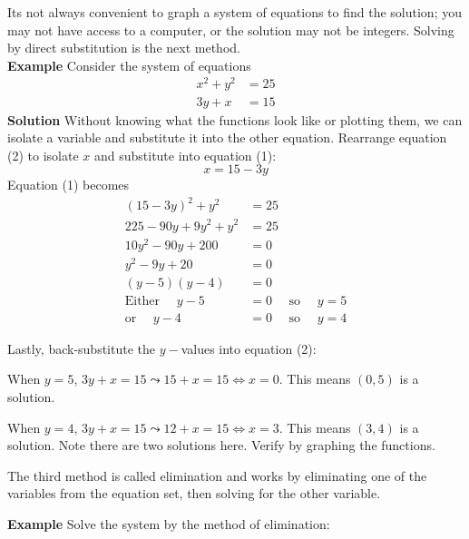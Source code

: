  Its not always convenient to graph a system of equations to find the solution; you may not have access to a computer, or the solution may not be integers. Solving by direct substitution is the next method.\\
 
 \textbf{Example} Consider the system of equations
 \begin{align}x^{2} +y^{2} &  = 25 \tag{1} \\
 3 y +x &  = 15 \tag{2}\end{align}
 \textbf{Solution} Without knowing what the functions look like or plotting them, we can isolate a variable and substitute it into the other equation. Rearrange equation (2) to isolate $x$ and substitute into equation (1):
$$x =  15 -3 y $$
 Equation (1) becomes
 \begin{align*}(15-3y)^2+y^2 &  =  25 \tag{expand and simplify}\\
 225-90y+9y^2+y^2&=25\\
 10 y^{2} -90 y +200 &  =  0 \tag{divide by 10}\\
 y^{2} -9 y +20 &  = 0 \tag{factor the quadratic}\\
 \left (y -5\right ) \left (y -4\right ) &  =  0 \\
 \text{Either }\quad y -5 &  =  0\quad\text{ so }\quad y =5 \\
 \text{or }\quad y -4 &  =  0\quad\text{ so }\quad y =4\end{align*}
 
Lastly, back-substitute the $y-$values into equation (2): 
 
 When $y =5$, $3 y +x =15 \leadsto 15 +x =15 \Longleftrightarrow x =0$. This means $\left (0 ,5\right )$ is a solution. 
 
 When $y =4$, $3 y +x =15 \leadsto 12 +x =15 \Longleftrightarrow x =3$. This means $\left (3 ,4\right )$ is a solution. 
 Note there are two solutions here. Verify by graphing the functions.
 
The third method is called elimination and works by eliminating one of the variables from the equation set, then solving for the other variable.

\textbf{Example} Solve the system by the method of elimination:


